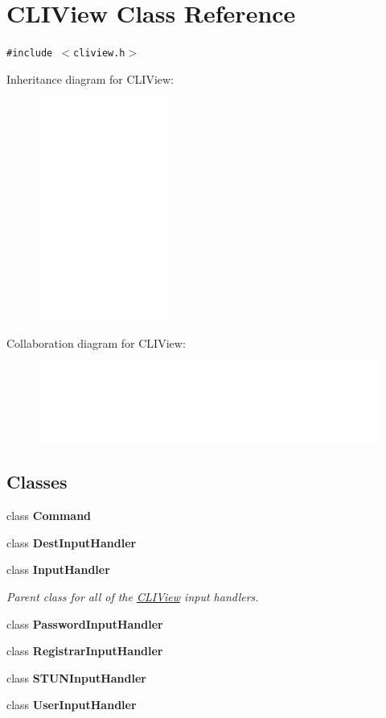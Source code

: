 \hypertarget{classCLIView}{
\section{CLIView Class Reference}
\label{classCLIView}
}
{\tt \#include $<$cliview.h$>$}

Inheritance diagram for CLIView:\nopagebreak
\begin{figure}[H]
\begin{center}
\leavevmode
\includegraphics[width=122pt]{classCLIView__inherit__graph}
\end{center}
\end{figure}
Collaboration diagram for CLIView:\nopagebreak
\begin{figure}[H]
\begin{center}
\leavevmode
\includegraphics[width=400pt]{classCLIView__coll__graph}
\end{center}
\end{figure}
\subsection*{Classes}
\begin{CompactItemize}
\item 
class \textbf{Command}
\item 
class \textbf{DestInputHandler}
\item 
class \textbf{InputHandler}
\begin{CompactList}\small\item\em Parent class for all of the \hyperlink{classCLIView}{CLIView} input handlers. \item\end{CompactList}\item 
class \textbf{PasswordInputHandler}
\item 
class \textbf{RegistrarInputHandler}
\item 
class \textbf{STUNInputHandler}
\item 
class \textbf{UserInputHandler}
\end{CompactItemize}
